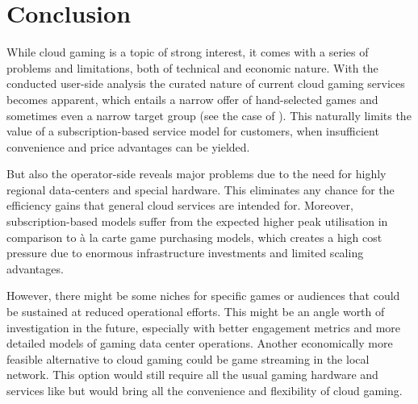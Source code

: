 \section{Conclusion}
\label{sec:conclusion}

While cloud gaming is a topic of strong interest, it comes with a series of problems and limitations, both of technical and economic nature. With the conducted user-side analysis the curated nature of current cloud gaming services becomes apparent, which entails a narrow offer of hand-selected games and sometimes even a narrow target group (see the case of \psnow). This naturally limits the value of a subscription-based service model for customers, when insufficient convenience and price advantages can be yielded. 


But also the operator-side reveals major problems due to the need for highly regional data-centers and special hardware. This eliminates any chance for the efficiency gains that general cloud services are intended for. Moreover, subscription-based models suffer from the expected higher peak utilisation in comparison to à la carte game purchasing models, which creates a high cost pressure due to enormous infrastructure investments and limited scaling advantages. 

However, there might be some niches for specific games or audiences that could be sustained at reduced operational efforts. This might be an angle worth of investigation in the future, especially with better engagement metrics and more detailed models of gaming data center operations. Another economically more feasible alternative to cloud gaming could be game streaming in the local network. This option would still require all the usual gaming hardware and services like \steam but would bring all the convenience and flexibility of cloud gaming.
